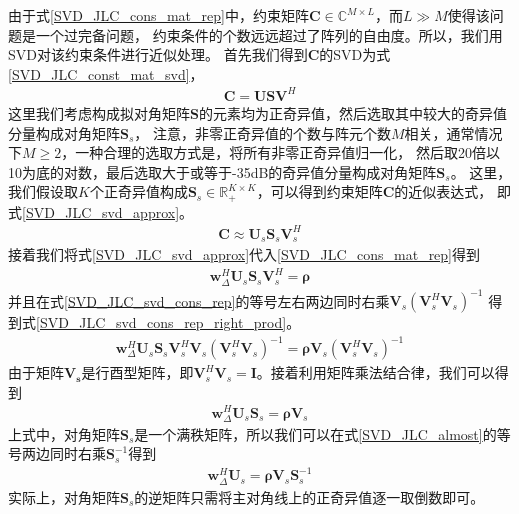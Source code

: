 \documentclass[master]{thesis-uestc}
\begin{document}
由于式\eqref{SVD_JLC_cons_mat_rep}中，约束矩阵$\bm{C}\in\mathbb{C}^{M\times L}$，而$L \gg M$使得该问题是一个过完备问题，
约束条件的个数远远超过了阵列的自由度。所以，我们用SVD对该约束条件进行近似处理。
首先我们得到$\bm{C}$的SVD为式\eqref{SVD_JLC_const_mat_svd}，
\begin{equation}\label{SVD_JLC_const_mat_svd}
    \begin{aligned}
        \bm{C} = \bm{USV}^H
    \end{aligned}
\end{equation}
这里我们考虑构成拟对角矩阵$\bm{S}$的元素均为正奇异值，然后选取其中较大的奇异值分量构成对角矩阵$\bm{S}_s$，
注意，非零正奇异值的个数与阵元个数$M$相关，通常情况下$M\ge2$，一种合理的选取方式是，将所有非零正奇异值归一化，
然后取20倍以10为底的对数，最后选取大于或等于-35dB的奇异值分量构成对角矩阵$\bm{S}_s$。
这里，我们假设取$K$个正奇异值构成$\bm{S}_s\in\mathbb{R}_+^{K \times K}$，可以得到约束矩阵$\bm{C}$的近似表达式，
即式\eqref{SVD_JLC_svd_approx}。
\begin{equation}\label{SVD_JLC_svd_approx}
    \begin{aligned}
        \bm{C} \approx \bm{U}_s\bm{S}_s\bm{V}^H_s
    \end{aligned}
\end{equation}
接着我们将式\eqref{SVD_JLC_svd_approx}代入\eqref{SVD_JLC_cons_mat_rep}得到
\begin{equation}\label{SVD_JLC_svd_cons_rep}
    \begin{aligned}
        \bm{w}^H_\Delta\bm{U}_s\bm{S}_s\bm{V}^H_s = \bm{\rho}
    \end{aligned}
\end{equation}
并且在式\eqref{SVD_JLC_svd_cons_rep}的等号左右两边同时右乘$\bm{V}_s\left(\bm{V}^H_s\bm{V}_s\right)^{-1}$
得到式\eqref{SVD_JLC_svd_cons_rep_right_prod}。
\begin{equation}\label{SVD_JLC_svd_cons_rep_right_prod}
    \begin{aligned}
        \bm{w}^H_\Delta\bm{U}_s\bm{S}_s\bm{V}^H_s\bm{V}_s\left(\bm{V}^H_s\bm{V}_s\right)^{-1} 
        = \bm{\rho}\bm{V}_s\left(\bm{V}^H_s\bm{V}_s\right)^{-1}
    \end{aligned}
\end{equation}
由于矩阵$\bm{V_s}$是行酉型矩阵，即$\bm{V}^H_s\bm{V}_s=\bm{I}$。接着利用矩阵乘法结合律，我们可以得到
\begin{equation}\label{SVD_JLC_almost}
    \begin{aligned}
        \bm{w}^H_\Delta\bm{U}_s\bm{S}_s = \bm{\rho}\bm{V}_s
    \end{aligned}
\end{equation}
上式中，对角矩阵$\bm{S}_s$是一个满秩矩阵，所以我们可以在式\eqref{SVD_JLC_almost}的等号两边同时右乘$\bm{S}^{-1}_s$得到
\begin{equation}\label{SVD_JLC_cons_fin}
    \begin{aligned}
        \bm{w}^H_\Delta\bm{U}_s = \bm{\rho}\bm{V}_s\bm{S}^{-1}_s
    \end{aligned}
\end{equation}
实际上，对角矩阵$\bm{S}_s$的逆矩阵只需将主对角线上的正奇异值逐一取倒数即可。
\end{document}
